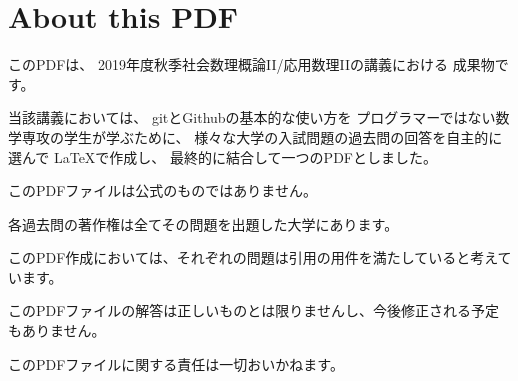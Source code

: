 \documentclass[main]{subfiles}
\begin{document}
\section{About this PDF}
このPDFは、
2019年度秋季社会数理概論II/応用数理IIの講義における
成果物です。

当該講義においては、
gitとGithubの基本的な使い方を
プログラマーではない数学専攻の学生が学ぶために、
様々な大学の入試問題の過去問の回答を自主的に選んで
\LaTeX で作成し、
最終的に結合して一つのPDFとしました。

このPDFファイルは公式のものではありません。

各過去問の著作権は全てその問題を出題した大学にあります。

このPDF作成においては、それぞれの問題は引用の用件を満たしていると考えています。

このPDFファイルの解答は正しいものとは限りませんし、今後修正される予定もありません。

このPDFファイルに関する責任は一切おいかねます。
\end{document}
